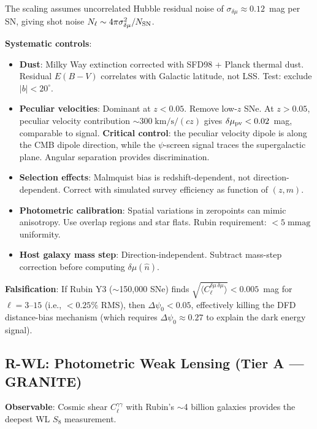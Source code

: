\documentclass[11pt,a4paper]{article}
\newcommand{\Dpsi}{\Delta\psi}
\begin{document}
\begin{distbox}
The scaling assumes uncorrelated Hubble residual noise of
$\sigma_{\delta\mu} \approx 0.12$~mag per SN, giving shot noise
$N_\ell \sim 4\pi\sigma_{\delta\mu}^2 / N_{\rm SN}$.

\textbf{Systematic controls}:
\begin{itemize}[nosep]
\item \textbf{Dust}: Milky Way extinction corrected with SFD98 +
  Planck thermal dust. Residual $E(B-V)$ correlates with Galactic
  latitude, not LSS.  Test: exclude $|b| < 20^\circ$.
\item \textbf{Peculiar velocities}: Dominant at $z < 0.05$.
  Remove low-$z$ SNe. At $z > 0.05$, peculiar velocity contribution
  $\sim 300\;\text{km/s} / (cz)$ gives $\delta\mu_{\rm pv} < 0.02$~mag,
  comparable to signal. \textbf{Critical control}: the peculiar velocity
  dipole is along the CMB dipole direction, while the $\psi$-screen
  signal traces the supergalactic plane. Angular separation provides
  discrimination.
\item \textbf{Selection effects}: Malmquist bias is redshift-dependent,
  not direction-dependent. Correct with simulated survey efficiency
  as function of $(z, m)$.
\item \textbf{Photometric calibration}: Spatial variations in zeropoints
  can mimic anisotropy. Use overlap regions and star flats.
  Rubin requirement: $< 5\;\text{mmag}$ uniformity.
\item \textbf{Host galaxy mass step}: Direction-independent. Subtract
  mass-step correction before computing $\delta\mu(\hat{n})$.
\end{itemize}

\textbf{Falsification}: If Rubin Y3 ($\sim$150,000 SNe) finds
$\sqrt{\langle C_\ell^{\delta\mu\,\delta\mu} \rangle} < 0.005$~mag
for $\ell = 3$--$15$ (i.e., $< 0.25\%$ RMS), then $\Dpsi_0 < 0.05$,
effectively killing the DFD distance-bias mechanism (which requires
$\Dpsi_0 \approx 0.27$ to explain the dark energy signal).

\end{distbox}


\subsection{R-WL: Photometric Weak Lensing
(Tier A --- GRANITE)}
\label{sec:rubin-wl}

\textbf{Observable}: Cosmic shear $C_\ell^{\gamma\gamma}$ with Rubin's
$\sim$4 billion galaxies provides the deepest WL $S_8$ measurement.
\end{document}
